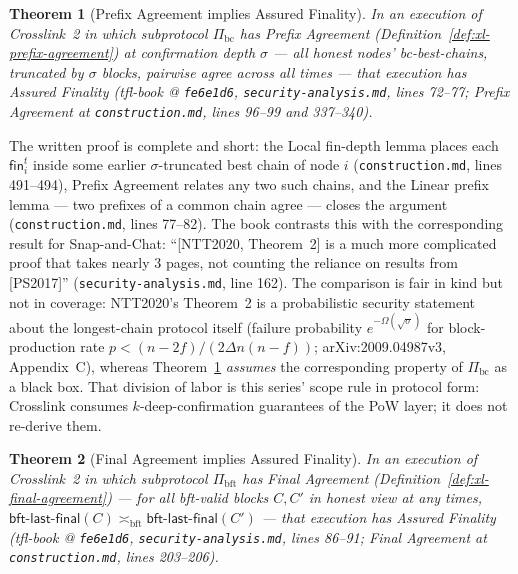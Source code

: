 \documentclass[11pt,a4paper]{article}
\newtheorem{theorem}{Theorem}[section]
\theoremstyle{definition}
\begin{document}
\begin{theorem}[Prefix Agreement implies Assured Finality]
\label{thm:xl-safety-prefix}
In an execution of Crosslink~2 in which subprotocol $\Pi_{\mathrm{bc}}$
has Prefix Agreement (Definition~\ref{def:xl-prefix-agreement}) at
confirmation depth $\sigma$ --- all honest nodes'
bc-best-chains, truncated by $\sigma$ blocks, pairwise agree across all
times --- that execution has Assured Finality (tfl-book @
\texttt{fe6e1d6}, \texttt{security-analysis.md}, lines 72--77;
Prefix Agreement at \texttt{construction.md}, lines 96--99 and 337--340).
\end{theorem}

The written proof is complete and short: the Local fin-depth lemma places
each $\mathsf{fin}_i^t$ inside some earlier $\sigma$-truncated best chain
of node $i$ (\texttt{construction.md}, lines 491--494), Prefix Agreement
relates any two such chains, and the Linear prefix lemma --- two prefixes
of a common chain agree --- closes the argument (\texttt{construction.md},
lines 77--82). The book contrasts this with the corresponding result for
Snap-and-Chat: ``[NTT2020, Theorem~2] is a much more complicated proof
that takes nearly 3 pages, not counting the reliance on results from
[PS2017]'' (\texttt{security-analysis.md}, line 162). The comparison is
fair in kind but not in coverage: NTT2020's Theorem~2 is a probabilistic
security statement about the longest-chain protocol itself (failure
probability $e^{-\Omega(\sqrt{\sigma})}$ for block-production rate
$p < (n-2f)/(2 \Delta n (n-f))$; arXiv:2009.04987v3, Appendix~C), whereas
Theorem~\ref{thm:xl-safety-prefix} \emph{assumes} the corresponding
property of $\Pi_{\mathrm{bc}}$ as a black box. That division of labor is
this series' scope rule in protocol form: Crosslink consumes
$k$-deep-confirmation guarantees of the PoW layer; it does not re-derive
them.

\begin{theorem}[Final Agreement implies Assured Finality]
\label{thm:xl-safety-final}
In an execution of Crosslink~2 in which subprotocol $\Pi_{\mathrm{bft}}$
has Final Agreement (Definition~\ref{def:xl-final-agreement}) --- for
all bft-valid blocks $C, C'$ in honest view at
any times, $\textsf{bft-last-final}(C) \asymp_{\mathrm{bft}}
\textsf{bft-last-final}(C')$ --- that execution has Assured Finality
(tfl-book @ \texttt{fe6e1d6}, \texttt{security-analysis.md}, lines 86--91;
Final Agreement at \texttt{construction.md}, lines 203--206).
\end{theorem}
\end{document}
